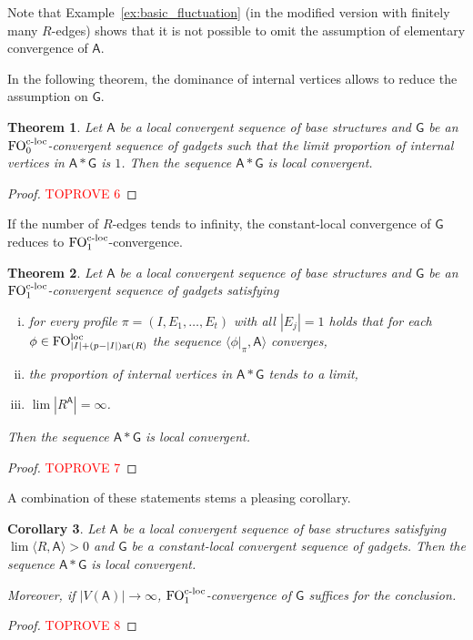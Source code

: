 \documentclass[11pt]{article}
\theoremstyle{plain}
\newtheorem{theorem}{Theorem}[section]
\newtheorem{corollary}[theorem]{Corollary}
\theoremstyle{definition}
\theoremstyle{remark}
\DeclareMathOperator\aritysym{ar}
\newcommand{\arity}[1]{{\aritysym({#1})}}
\DeclareMathOperator\FO{FO}
\newcommand{\FOloc}[1]{\FO_{#1}^\textnormal{loc}}
\newcommand{\FOcloc}[1]{\FO_{#1}^{\textnormal{c-loc}}}
\newcommand{\stonepar}[2]{\langle #1, #2 \rangle}
\newcommand{\strseq}[1]{{\boldsymbol{\mathsf{#1}}}}
\begin{document}
Note that Example~\ref{ex:basic_fluctuation} (in the modified version with finitely many $R$-edges) shows that it is not possible to omit the assumption of elementary convergence of $\strseq{A}$.

In the following theorem, the dominance of internal vertices allows to reduce the assumption on $\strseq{G}$.

\begin{theorem}\label{thm:fo_dominant_internal_vertices}
    Let $\strseq{A}$ be a local convergent sequence of base structures and $\strseq{G}$ be an $\FOcloc{0}$-convergent sequence of gadgets such that the limit proportion of internal vertices in $\strseq{A}*\strseq{G}$ is $1$.
    Then the sequence $\strseq{A}*\strseq{G}$ is local convergent.
\end{theorem}
\begin{proof}\textcolor{red}{TOPROVE 6}\end{proof}

If the number of $R$-edges tends to infinity, the constant-local convergence of $\strseq{G}$ reduces to $\FOcloc{1}$-convergence.

\begin{theorem}\label{thm:fo_general_conditioning_with_infinitely_many_r_edges}
    Let $\strseq{A}$ be a local convergent sequence of base structures and $\strseq{G}$ be an $\FOcloc{1}$-convergent sequence of gadgets satisfying
    \begin{enumerate}[(i)]
        \item for every profile $\pi = (I,E_1, \dots, E_t)$ with all $|E_j| = 1$ holds that for each $\phi \in \FOloc{|I|+(p-|I|)\arity{R}}$ the sequence $\stonepar{\phi|_\pi}{\strseq{A}}$ converges,
        \item the proportion of internal vertices in $\strseq{A}*\strseq{G}$ tends to a limit,
        \item $\lim |R^\strseq{A}| = \infty$.
    \end{enumerate}
    Then the sequence $\strseq{A}*\strseq{G}$ is local convergent.
\end{theorem}
\begin{proof}\textcolor{red}{TOPROVE 7}\end{proof}

A combination of these statements stems a pleasing corollary.

\begin{corollary}\label{cor:fo_dense_edges}
    Let $\strseq{A}$ be a local convergent sequence of base structures satisfying $\lim \stonepar{R}{\strseq{A}} > 0$ and $\strseq{G}$ be a constant-local convergent sequence of gadgets.
    Then the sequence $\strseq{A}*\strseq{G}$ is local convergent.
    
    Moreover, if $|V(\strseq{A})| \to \infty$, $\FOcloc{1}$-convergence of $\strseq{G}$ suffices for the conclusion.
\end{corollary}
\begin{proof}\textcolor{red}{TOPROVE 8}\end{proof}
\end{document}
